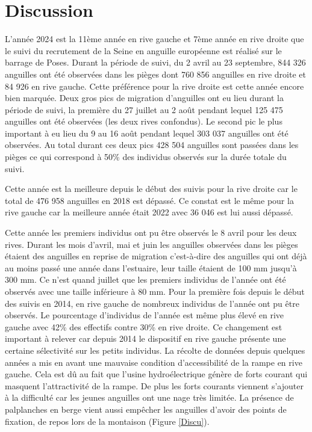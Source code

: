 \documentclass[11pt,titlepage,twoside]{article}\usepackage[]{graphicx}\usepackage[table]{xcolor}
\begin{document}
\section{Discussion}

L’année 2024 est la 11ème année en rive gauche et 7ème année en rive droite que le suivi du recrutement de la Seine en anguille européenne est réalisé sur le barrage de Poses. Durant la période de suivi, du 2 avril au 23 septembre, 844 326 anguilles ont été observées dans les pièges dont 760 856 anguilles en rive droite et 84 926 en rive gauche. Cette préférence pour la rive droite est cette année encore bien marquée. Deux gros pics de migration d’anguilles ont eu lieu durant la période de suivi, la première du 27 juillet au 2 août pendant lequel 125 475 anguilles ont été observées (les deux rives confondus). Le second pic le plus important à eu lieu du 9 au 16 août pendant lequel 303 037 anguilles ont été observées. Au total durant ces deux pics 428 504 anguilles sont passées dans les pièges ce qui correspond à 50\% des individus observés sur la durée totale du suivi. 

\vspace{0.5cm}
Cette année est la meilleure depuis le début des suivis pour la rive droite car le total de 476 958 anguilles en 2018 est dépassé. Ce constat est le même pour la rive gauche car la meilleure année était 2022 avec 36 046 est lui aussi dépassé. 

\vspace{0.5cm}
Cette année les premiers individus ont pu être observés le 8 avril pour les deux rives. Durant les mois d’avril, mai et juin les anguilles observées dans les pièges étaient des anguilles en reprise de migration c’est-à-dire des anguilles qui ont déjà au moins passé une année dans l’estuaire, leur taille étaient de 100 mm jusqu’à 300 mm. Ce n’est quand juillet que les premiers individus de l’année ont été observés avec une taille inférieure à 80 mm. Pour la première fois depuis le début des suivis en 2014, en rive gauche de nombreux individus de l’année ont pu être observés. Le pourcentage d’individus de l’année est même plus élevé en rive gauche avec 42\% des effectifs contre 30\% en rive droite. Ce changement est important à relever car depuis 2014 le dispositif en rive gauche présente une certaine sélectivité sur les petits individus. La récolte de données depuis quelques années a mis en avant une mauvaise condition d’accessibilité de la rampe en rive gauche. Cela est dû au fait que l’usine hydroélectrique génère de forts courant qui masquent l’attractivité de la rampe. De plus les forts courants viennent s’ajouter à la difficulté car les jeunes anguilles ont une nage très limitée. La présence de palplanches en berge vient aussi empêcher les anguilles d’avoir des points de fixation, de repos lors de la montaison (Figure \ref{Discu}). 
\end{document}
